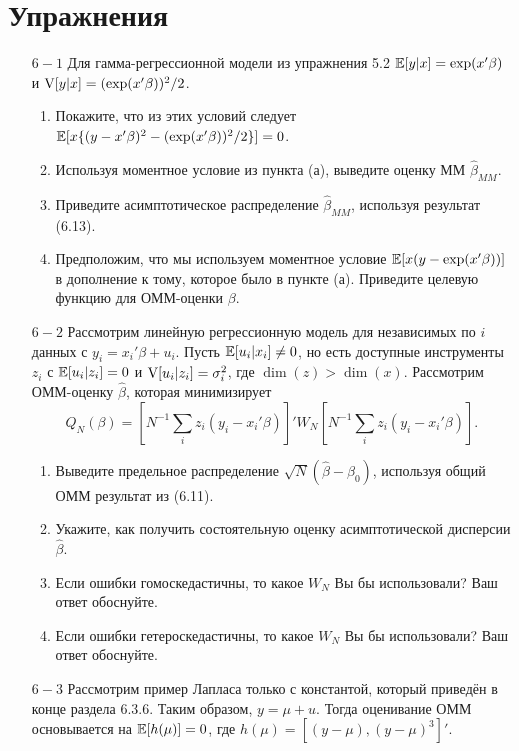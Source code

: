 \section{Упражнения}

\begin{enumerate}
\item [$6 - 1$] Для гамма-регрессионной модели из упражнения 5.2 $\mathbb{E}[y|x] = \exp(x'\beta)$ и $\mathrm{V}[y|x] = (\exp(x'\beta))^2/2$.
\begin{enumerate}
\item Покажите, что из этих условий следует $\mathbb{E}[x\{(y-x'\beta)^2 - (\exp(x'\beta))^2/2\}] = 0$.
\item Используя моментное условие из пункта (а), выведите оценку ММ $\hat{\beta}_{MM}$.
\item Приведите асимптотическое распределение $\hat{\beta}_{MM}$, используя результат (6.13).
\item Предположим, что мы используем моментное условие  $\mathbb{E}[x(y-\exp(x'\beta))]$ в дополнение к тому, которое было
в пункте (а). Приведите целевую функцию для ОММ-оценки $\beta$.
\end{enumerate}
\item [$6 - 2$] Рассмотрим линейную регрессионную модель для независимых по $i$ данных с $y_i = x_i'\beta + u_i$. Пусть $\mathbb{E}[u_i|x_i] \not= 0$, но есть доступные инструменты $z_i$ с $\mathbb{E}[u_i|z_i] = 0$ и $\mathrm{V}[u_i|z_i] = \sigma_i^2$, где $\dim(z) > \dim(x)$. Рассмотрим ОММ-оценку $\hat{\beta}$, которая минимизирует
\[
Q_N(\beta) = \left[ N^{-1} \sum_i z_i(y_i - x_i'\beta) \right]'W_N \left[  N^{-1} \sum_i z_i(y_i - x_i'\beta) \right].
\]
\begin{enumerate}
\item Выведите предельное распределение $\sqrt{N}(\hat{\beta} - \beta_0)$, используя общий ОММ результат из (6.11).
\item Укажите, как получить состоятельную оценку асимптотической дисперсии $\hat{\beta}$.
\item Если ошибки гомоскедастичны, то какое $W_N$ Вы бы использовали? Ваш ответ обоснуйте.
\item Если ошибки гетероскедастичны, то какое $W_N$ Вы бы использовали? Ваш ответ обоснуйте.
\end{enumerate}
\item [$6 - 3$] Рассмотрим пример Лапласа только с константой, который приведён в конце раздела 6.3.6. Таким образом, $y = \mu + u$. Тогда оценивание ОММ основывается на $\mathbb{E}[h(\mu)] = 0$, где $h(\mu) = [(y-\mu), (y-\mu)^3]'$.
\begin{enumerate}

\end{enumerate}
\end{enumerate}
